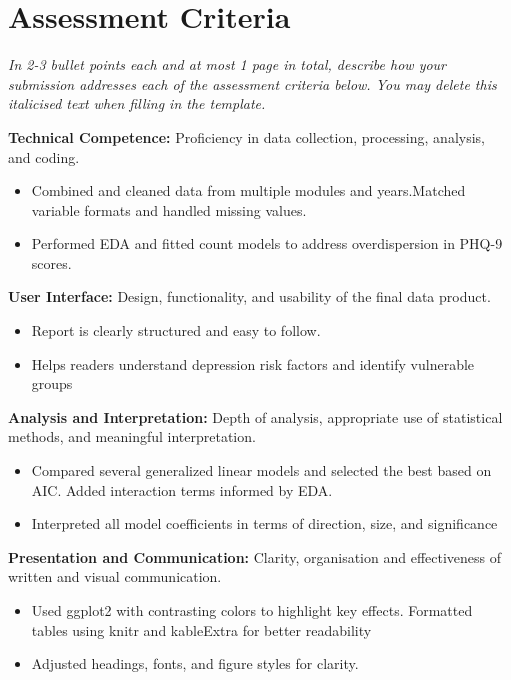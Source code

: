 \documentclass[a4paper, 12pt]{article}
\begin{document}
\pagebreak

\section{Assessment Criteria}

\textit{In 2-3 bullet points each and at most 1 page in total, describe how your submission addresses each of the assessment criteria below. You may delete this italicised text when filling in the template.} 

\textbf{Technical Competence:} Proficiency in data collection, processing, analysis, and coding.

\begin{itemize}
    \item Combined and cleaned data from multiple modules and years.Matched variable formats and handled missing values.
    \item Performed EDA and fitted count models to address overdispersion in PHQ-9 scores.
\end{itemize}

\textbf{User Interface:} Design, functionality, and usability of the final data product.

\begin{itemize}
    \item Report is clearly structured and easy to follow.
    \item Helps readers understand depression risk factors and identify vulnerable groups
\end{itemize}

\textbf{Analysis and Interpretation:} Depth of analysis, appropriate use of statistical methods, and meaningful interpretation.

\begin{itemize}
    \item Compared several generalized linear models and selected the best based on AIC. Added interaction terms informed by EDA.
    \item Interpreted all model coefficients in terms of direction, size, and significance
    \end{itemize}

\textbf{Presentation and Communication:} Clarity, organisation and effectiveness of written and visual communication.

\begin{itemize}
    \item Used ggplot2 with contrasting colors to highlight key effects. Formatted tables using knitr and kableExtra for better readability
    \item Adjusted headings, fonts, and figure styles for clarity.
\end{itemize}
\end{document}
